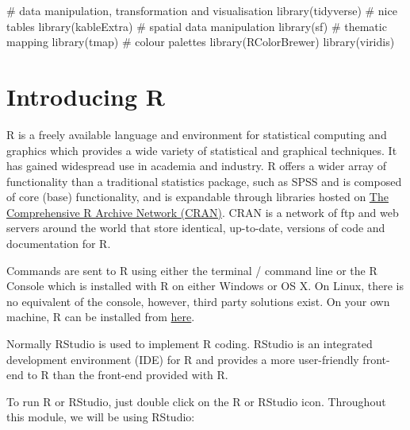 \documentclass[
  letterpaper,
  DIV=11,
  numbers=noendperiod,
  oneside]{scrreprt}
\newenvironment{Shaded}{\begin{snugshade}}{\end{snugshade}}
\newcommand{\CommentTok}[1]{\textcolor[rgb]{0.37,0.37,0.37}{#1}}
\newcommand{\FunctionTok}[1]{\textcolor[rgb]{0.28,0.35,0.67}{#1}}
\newcommand{\NormalTok}[1]{\textcolor[rgb]{0.00,0.23,0.31}{#1}}
\begin{document}
\begin{Shaded}
\begin{Highlighting}[]
\CommentTok{\# data manipulation, transformation and visualisation}
\FunctionTok{library}\NormalTok{(tidyverse)}
\CommentTok{\# nice tables}
\FunctionTok{library}\NormalTok{(kableExtra)}
\CommentTok{\# spatial data manipulation}
\FunctionTok{library}\NormalTok{(sf) }
\CommentTok{\# thematic mapping}
\FunctionTok{library}\NormalTok{(tmap) }
\CommentTok{\# colour palettes}
\FunctionTok{library}\NormalTok{(RColorBrewer) }
\FunctionTok{library}\NormalTok{(viridis)}
\end{Highlighting}
\end{Shaded}

\section{Introducing R}\label{introducing-r}

R is a freely available language and environment for statistical
computing and graphics which provides a wide variety of statistical and
graphical techniques. It has gained widespread use in academia and
industry. R offers a wider array of functionality than a traditional
statistics package, such as SPSS and is composed of core (base)
functionality, and is expandable through libraries hosted on
\href{https://cran.r-project.org}{The Comprehensive R Archive Network
(CRAN)}. CRAN is a network of ftp and web servers around the world that
store identical, up-to-date, versions of code and documentation for R.

Commands are sent to R using either the terminal / command line or the R
Console which is installed with R on either Windows or OS X. On Linux,
there is no equivalent of the console, however, third party solutions
exist. On your own machine, R can be installed from
\href{https://www.r-project.org/}{here}.

Normally RStudio is used to implement R coding. RStudio is an integrated
development environment (IDE) for R and provides a more user-friendly
front-end to R than the front-end provided with R.

To run R or RStudio, just double click on the R or RStudio icon.
Throughout this module, we will be using RStudio:
\end{document}
